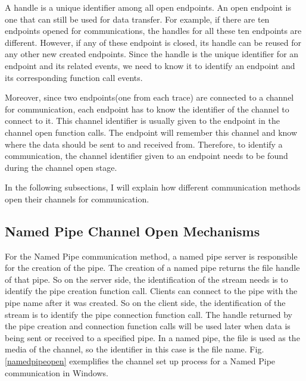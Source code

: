 A handle is a unique identifier among all open endpoints. An open endpoint is one that can still be used for data transfer. For example, if there are ten endpoints opened for communications, the handles for all these ten endpoints are different. However, if any of these endpoint is closed, its handle can be reused for any other new created endpoints. Since the handle is the unique identifier for an endpoint and its related events, we need to know it to identify an endpoint and its corresponding function call events. 

Moreover, since two endpoints(one from each trace) are connected to a channel for communication, each endpoint has to know the identifier of the channel to connect to it. This channel identifier is usually given to the endpoint in the channel open function calls. The endpoint will remember this channel and know where the data should be sent to and received from. Therefore, to identify a communication, the channel identifier given to an endpoint needs to be found during the channel open stage.

In the following subsections, I will explain how different communication methods open their channels for communication.

\subsection{Named Pipe Channel Open Mechanisms} 
For the Named Pipe communication method, a named pipe server is responsible for the creation of the pipe. The creation of a named pipe returns the file handle of that pipe. So on the server side, the identification of the stream needs is to identify the pipe creation function call. Clients can connect to the pipe with the pipe name after it was created. So on the client side, the identification of the stream is to identify the pipe connection function call. The handle returned by the pipe creation and connection function calls will be used later when data is being sent or received to a specified pipe. In a named pipe, the file is used as the media of the channel, so the identifier in this case is the file name. Fig. \ref{namedpipeopen} exemplifies the channel set up process for a Named Pipe communication in Windows. 

